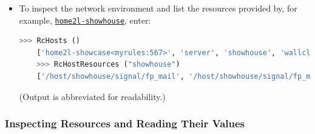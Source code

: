 \documentclass[12pt,english,parskip=half,headheight=19pt]{scrreprt}
\newcommand{\idx}[1]{#1\index{#1}}
\newcommand{\reftool}[1]{\hyperref[tool:#1]{\texttt{\idx{#1}}}}
\begin{document}
\begin{itemize}[$\blacktriangleright$]
\item
  To inspect the network environment and list the resources provided by, for example,
  \reftool{home2l-showhouse}, enter:
  \begin{lstlisting}[language=python]
    >>> RcHosts ()
    ['home2l-showcase<myrules:567>', 'server', 'showhouse', 'wallclock']
    >>> RcHostResources ("showhouse")
    ['/host/showhouse/signal/fp_mail', '/host/showhouse/signal/fp_music', '/host/showhouse/signal/fp_phone', '/host/showhouse/signal/fp_temp_bath',  ..., '/host/showhouse/world/bath-shades', '/host/showhouse/world/bath-window', '/host/showhouse/world/bedroom-shades', ..., '/host/showhouse/world/lock', '/host/showhouse/world/motion', '/host/showhouse/world/simBadWeather', '/host/showhouse/world/simDaylight']
  \end{lstlisting}
  (Output is abbreviated for readability.)
\end{itemize}



\subsubsection*{Inspecting Resources and Reading Their Values}
\end{document}
